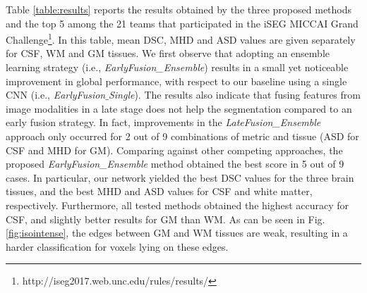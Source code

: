 \documentclass[twoside,espcrc2]{elsarticle}
\begin{document}
Table \ref{table:results} reports the results obtained by the three proposed methods and the top 5 among the 21 teams that participated in the iSEG MICCAI Grand Challenge\footnote{http://iseg2017.web.unc.edu/rules/results/}. In this table, mean DSC, MHD and ASD values are given separately for CSF, WM and GM tissues. We first observe that adopting an ensemble learning strategy (i.e., \textit{EarlyFusion\_Ensemble}) results in a small yet noticeable improvement in global performance, with respect to our baseline using a single CNN (i.e., \textit{EarlyFusion$\_$Single}). The results also indicate that fusing features from image modalities in a late stage does not help the segmentation compared to an early fusion strategy. In fact, improvements in the \textit{LateFusion\_Ensemble} approach only occurred for 2 out of 9 combinations of metric and tissue (ASD for CSF and MHD for GM). Comparing against other competing approaches, the proposed \textit{EarlyFusion\_Ensemble} method obtained the best score in 5 out of 9 cases. In particular, our network yielded the best DSC values for the three brain tissues, and the best MHD and ASD values for CSF and white matter, respectively. Furthermore, all tested methods obtained the highest accuracy for CSF, and slightly better results for GM than WM. As can be seen in Fig. \ref{fig:isointense}, the edges between GM and WM tissues are weak, resulting in a harder classification for voxels lying on these edges. 
\end{document}
